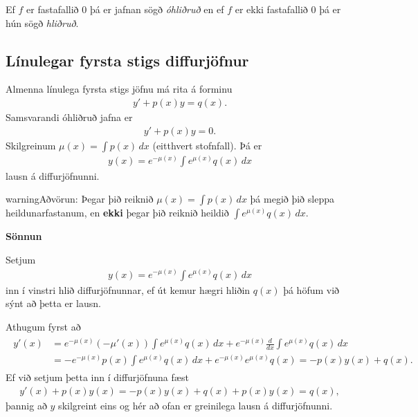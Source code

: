 \documentclass[a4paper,10pt,icelandic]{sphinxmanual}
\begin{document}
Ef \(f\) er fastafallið \(0\) þá er jafnan sögð \textit{óhliðruð}
en ef \(f\) er ekki fastafallið \(0\) þá er hún
sögð \textit{hliðruð}.


\subsection{Línulegar fyrsta stigs diffurjöfnur}
\label{kafli08:id2}\label{kafli08:index-4}
Almenna línulega fyrsta stigs jöfnu má rita á forminu
\begin{equation*}
\begin{split}y'+p(x)y=q(x).\end{split}
\end{equation*}
Samsvarandi óhliðruð jafna er
\begin{equation*}
\begin{split}y'+p(x)y=0.\end{split}
\end{equation*}
Skilgreinum \(\mu(x)=\int p(x)\,dx\) (eitthvert stofnfall). Þá er
\begin{equation*}
\begin{split}y(x)=e^{-\mu(x)}\int e^{\mu(x)}q(x)\,dx\end{split}
\end{equation*}
lausn á diffurjöfnunni.

\begin{notice}{warning}{Aðvörun:}
Þegar þið reiknið \(\mu(x)=\int p(x)\,dx\) þá megið þið sleppa
heildunarfastanum, en \textbf{ekki} þegar þið reiknið heildið
\(\int e^{\mu(x)}q(x)\,dx\).
\end{notice}

\textbf{Sönnun}

Setjum
\begin{equation*}
\begin{split}y(x)=e^{-\mu(x)}\int e^{\mu(x)}q(x)\,dx\end{split}
\end{equation*}
inn í vinstri hlið diffurjöfnunnar, ef út kemur hægri hliðin \(q(x)\) þá
höfum við sýnt að þetta er lausn.

Athugum fyrst að
\begin{equation*}
\begin{split}\begin{aligned}
y'(x) &=e^{-\mu(x)}(-\mu'(x)) \int e^{\mu(x)}q(x)\, dx + e^{-\mu(x)} \frac{d}{dx} \int e^{\mu(x)}q(x)\,dx \\
&= -e^{-\mu(x)}p(x)\int e^{\mu(x)}q(x)\, dx +  e^{-\mu(x)} e^{\mu(x)}q(x) = -p(x)y(x) + q(x).
\end{aligned}\end{split}
\end{equation*}
Ef við setjum þetta inn í diffurjöfnuna fæst
\begin{equation*}
\begin{split}y'(x) + p(x)y(x) = -p(x)y(x) + q(x) + p(x)y(x) = q(x),\end{split}
\end{equation*}
þannig að \(y\) skilgreint eins og hér að ofan er greinilega lausn á diffurjöfnunni.
\end{document}

